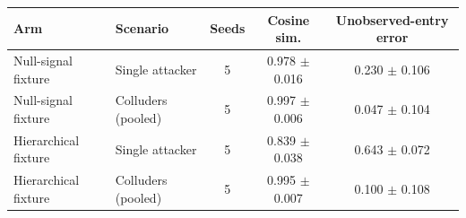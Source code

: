 \begin{tabular}{llccc}
\toprule
Arm & Scenario & Seeds & Cosine sim. & Unobserved-entry error \\
\midrule
Null-signal fixture & Single attacker & 5 & 0.978 $\pm$ 0.016 & 0.230 $\pm$ 0.106 \\
Null-signal fixture & Colluders (pooled) & 5 & 0.997 $\pm$ 0.006 & 0.047 $\pm$ 0.104 \\
Hierarchical fixture & Single attacker & 5 & 0.839 $\pm$ 0.038 & 0.643 $\pm$ 0.072 \\
Hierarchical fixture & Colluders (pooled) & 5 & 0.995 $\pm$ 0.007 & 0.100 $\pm$ 0.108 \\
\bottomrule
\end{tabular}

